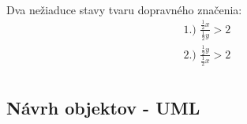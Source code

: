 \documentclass[12pt]{article}
\begin{document}
\paragraph{}
Dva nežiaduce stavy tvaru dopravného značenia:
\begin{align*}
		  \text{ 1.) }
          \frac{\frac{1}{2} x}{\frac{1}{2} y} > 2  \\
          \text{ 2.) }
          \frac{\frac{1}{2} y}{\frac{1}{2} x} > 2  \\
\end{align*}
\subsection{Návrh objektov - UML}
\end{document}
